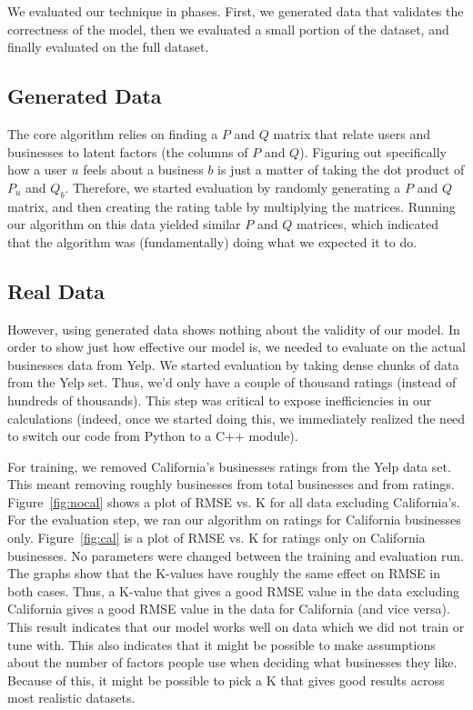 We evaluated our technique in phases. First, we generated data that
validates the correctness of the model, then we evaluated a small portion of
the dataset, and finally evaluated on the full dataset.

\subsection{Generated Data}
The core algorithm relies on finding a $P$ and $Q$ matrix that relate users and
businesses to latent factors (the columns of $P$ and $Q$).  Figuring out
specifically how a user $u$ feels about a business $b$ is just a matter of
taking the dot product of $P_u$ and $Q_b$.  Therefore, we started evaluation by
randomly generating a $P$ and $Q$ matrix, and then creating the rating table
by multiplying the matrices. Running our algorithm on this data yielded similar
$P$ and $Q$ matrices, which indicated that the algorithm was (fundamentally) doing
what we expected it to do.

\subsection{Real Data}
However, using generated data shows nothing about the validity of our model. In
order to show just how effective our model is, we needed to evaluate on
the actual businesses data from Yelp. We started evaluation by taking dense
chunks of data from the Yelp set. Thus, we'd only have a couple of thousand
ratings (instead of hundreds of thousands).  This step was critical to expose
inefficiencies in our calculations (indeed, once we started doing this, we
immediately realized the need to switch our code from Python to a C++ module).

For training, we removed California's businesses ratings from the Yelp data
set. This meant removing roughly \numBusCA businesses from \numBusTotal total
businesses and \numRatingCA from \numRatingTotal ratings.
Figure~\ref{fig:nocal} shows a plot of RMSE vs. K for all data excluding
California's. For the evaluation step, we ran our algorithm on ratings for
California businesses only. Figure~\ref{fig:cal} is a plot of RMSE vs. K for
ratings only on California businesses. No parameters were changed between the
training and evaluation run. The graphs show that the K-values have roughly the
same effect on RMSE in both cases. Thus, a K-value that gives a good RMSE value
in the data excluding California gives a good RMSE value in the data for
California (and vice versa). This result indicates that our model works well on
data which we did not train or tune with. This also indicates that it might be
possible to make assumptions about the number of factors people use when
deciding what businesses they like. Because of this, it might be possible to
pick a K that gives good results across most realistic datasets.

